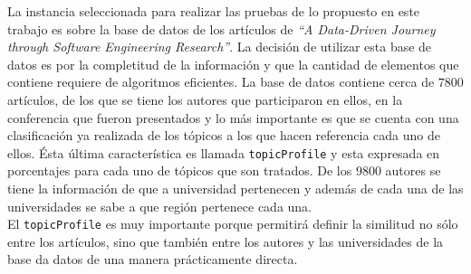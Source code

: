 La instancia seleccionada para realizar las pruebas de lo propuesto en este trabajo es sobre la base de datos de los artículos de \textit{\textquotedblleft A Data-Driven Journey through Software Engineering Research\textquotedblright}\cite{dataDrive}. La decisión de utilizar esta base de datos es por la completitud de la información y que la cantidad de elementos que contiene requiere de algoritmos eficientes. La base de datos contiene cerca de $7800$ artículos, de los que se tiene los autores que participaron en ellos, en la conferencia que fueron presentados y lo más importante es que se cuenta con una clasificación ya realizada de los tópicos a los que hacen referencia cada uno de ellos. Ésta última característica es llamada \texttt{topicProfile} y esta expresada en porcentajes para cada uno de tópicos que son tratados. De los $9800$ autores se tiene la información de que a universidad pertenecen y además de cada una de las universidades se sabe a que región pertenece cada una.\\

El \texttt{topicProfile} es muy importante porque permitirá definir la similitud no sólo entre los artículos, sino que también entre los autores y las universidades de la base da datos de una manera prácticamente directa.\\

